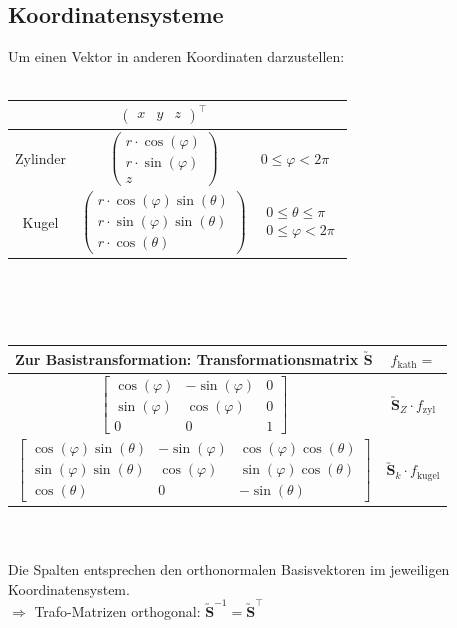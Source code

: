 \documentclass[6pt,a4paper]{scrartcl}
\newcommand{\mat}[1]{\ensuremath{\begin{bmatrix} #1 \end{bmatrix}}}								%
\newcommand{\ma}[1]{\ensuremath{\utilde{\boldsymbol {#1}}}}										%
\newcommand{\vect}[1]{\ensuremath{\begin{pmatrix} #1 \end{pmatrix}}}							%
\newcommand{\Ra}[0]{\ensuremath{\Rightarrow}}									%
\begin{document}
\begin{multicols}{4}
\section{Koordinatensysteme}
Um einen Vektor in anderen Koordinaten darzustellen:\\ \\
\begin{tabular}{c | c  l} 
&$\vect{ x & y & z}^\top$ &  \\ \midrule
Zylinder & $\begin{pmatrix} r \cdot \cos (\varphi) \\ r \cdot \sin (\varphi) \\ z \end{pmatrix}$ & $0 \le \varphi < 2 \pi$ \\ 
Kugel & $\begin{pmatrix} r \cdot \cos(\varphi) \sin(\theta) \\ r \cdot \sin(\varphi) \sin(\theta) \\ r \cdot \cos(\theta) \end{pmatrix}$ &$\begin{matrix}0 \le \theta \le \pi \\ 0 \le \varphi < 2 \pi\end{matrix}$
\end{tabular} \\ \\
 \\ 
\begin{tabular}{c | c} 
Zur Basistransformation: Transformationsmatrix $\ma S$ &  $f_{\text{kath}} =$ \\ \midrule
$\mat{ \cos(\varphi) &  -\sin(\varphi) & 0\\ \sin(\varphi) & \cos(\varphi) & 0 \\ 0 & 0 & 1 }$ &  $ \ma S_Z \cdot f_{\text{zyl}}$ \\
$\mat{ \cos(\varphi) \sin(\theta) & - \sin(\varphi) & \cos(\varphi)\cos(\theta) \\ \sin(\varphi)\sin(\theta) & \cos(\varphi) & \sin(\varphi)\cos(\theta) \\ \cos(\theta) & 0 & - \sin(\theta) }$ & $\ma S_k \cdot f_{\text{kugel}}$
\end{tabular}
\\ \\
Die Spalten entsprechen den orthonormalen Basisvektoren im jeweiligen Koordinatensystem. \\ $\Ra$ Trafo-Matrizen orthogonal: $\ma S^{-1} = \ma S^\top$\\



\end{multicols}
\end{document}
